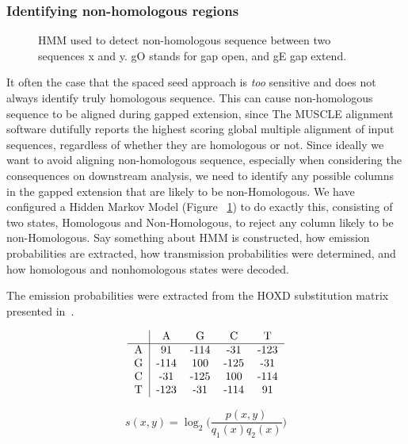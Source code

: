 \documentclass{ws-procs9x6}
\begin{document}
\subsubsection{Identifying non-homologous regions}
\begin{figure}[t]
\centering {}
\caption{HMM used to detect non-homologous sequence between two sequences x and y. gO stands for gap open, and gE gap extend. }

\label{fig-hmm}\vspace{-0.2cm}
\end{figure}

It often the case that the spaced seed approach is \emph{too} sensitive and does not always identify truly homologous sequence. This can cause non-homologous sequence to be aligned during gapped extension, since The MUSCLE alignment software dutifully reports the highest scoring global multiple alignment of input sequences, regardless of whether they are homologous or not. Since ideally we want to avoid aligning non-homologous sequence, especially when considering the consequences on downstream analysis, we need to identify any possible columns in the gapped extension that are likely to be non-Homologous. We have configured a Hidden Markov Model (Figure ~\ref{fig-hmm}) to do exactly this, consisting of two states, Homologous and Non-Homologous, to reject any column likely to be non-Homologous. Say something about HMM is constructed, how emission probabilities are extracted, how transmission probabilities were determined, and how homologous and nonhomologous states were decoded.

The emission probabilities were extracted from the HOXD substitution matrix presented in~\cite{hoxd}.

\begin{equation}
\begin{tabular}
{c|cccc}
& A & G & C & T \\
\hline
 A   & 91 & -114 &-31 & -123 \\
 G   & -114 & 100 &-125 & -31 \\
 C   & -31 & -125 &100 & -114\\
 T   & -123 & -31 &-114 & 91 \\
\end{tabular}
\end{equation}

\begin{equation}
s(x,y)= \log_{2}{\Bigg(\frac{p(x,y)}{q_{1}(x)q_{2}(x)}\Bigg)}
\end{equation}
\end{document}
